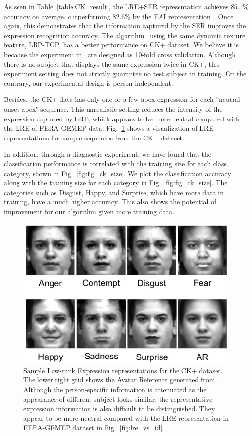\documentclass[journal]{IEEEtran}
\begin{document}
As seen in Table~\ref{table:CK_result}, the LRE+SER representation achieves $85.1\%$ accuracy on average, outperforming $82.6\%$ by the EAI representation~\cite{Yang_SMCB12}. Once again, this demonstrates that the information captured by the SER improves the expression recognition accuracy. The algorithm~\cite{Zhao_PAMI07} using the same dynamic texture feature, LBP-TOP, has a better performance on CK+ dataset. We believe it is because the experiment in~\cite{Zhao_PAMI07} are designed as 10-fold cross validation. Although there is no subject that displays the same expression twice in CK+, this experiment setting does not strictly guarantee no test subject in training. On the contrary, our experimental design is person-independent.

Besides, the CK+ data has only one or a few apex expression for each ``neutral-onset-apex" sequence. This unrealistic setting reduces the intensity of the expression captured by LRE, which appears to be more neutral compared with the LRE of FERA-GEMEP data. Fig.~\ref{fig:ck_eai} shows a visualization of LRE representations for sample sequences from the CK+ dataset. 

In addition, through a diagnostic experiment, we have found that the classification performance is correlated with the training size for each class category, shown in Fig.~\ref{fig:fig_ck_size}. We plot the classification accuracy along with the training size for each category in Fig.~\ref{fig:fig_ck_size}. The categories such as Disgust, Happy, and Surprise, which have more data in training, have a much higher accuracy. This also shows the potential of improvement for our algorithm given more training data. 

\begin{figure}[htbp]
	\centering
		\includegraphics[width=.7\columnwidth]{pics/ck_eai.png}
	\caption{Sample Low-rank Expression representations for the CK+ dataset. The lower right grid shows the Avatar Reference generated from~\cite{Yang_SMCB12}. Although the person-specific information is attenuated as the appearance of different subject looks similar, the representative expression information is also difficult to be distinguished. They appear to be more neutral compared with the LRE representation in FERA-GEMEP dataset in Fig.~\ref{fig:lre_vs_id}.}
	\label{fig:ck_eai}
\end{figure}
\end{document}
